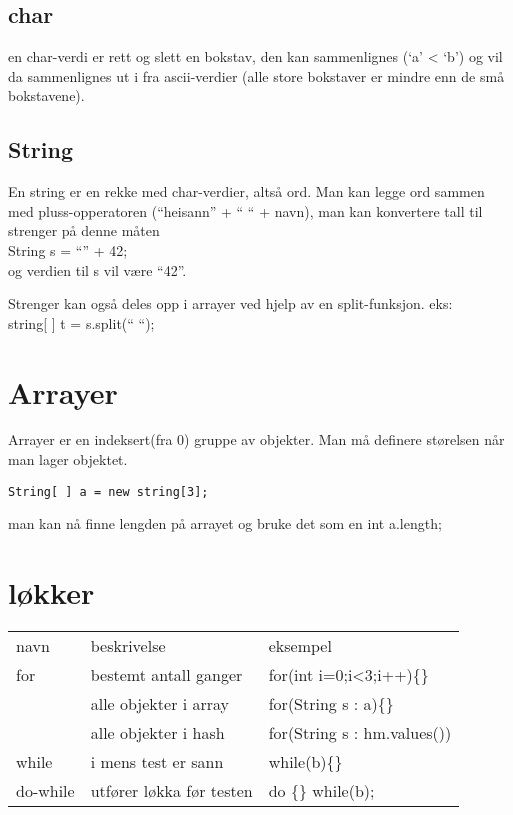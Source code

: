 \documentclass[11pt]{article}
\begin{document}
\subsection{char}
\label{sec-3_1}


   en char-verdi er rett og slett en bokstav, den kan sammenlignes (`a' < `b') 
   og vil da sammenlignes ut
   i fra ascii-verdier (alle store bokstaver er mindre enn de små bokstavene).
\subsection{String}
\label{sec-3_2}


   En string er en rekke med char-verdier, altså ord. Man kan legge ord
   sammen med pluss-opperatoren 
   (``heisann'' + `` `` + navn), man kan konvertere tall til strenger på denne måten\\
   String s = ``'' + 42;\\
   og verdien til s vil være ``42''.

   Strenger kan også deles opp i arrayer ved hjelp av en split-funksjon. eks:\\
   string[ ] t = s.split(`` ``);
\section{Arrayer}
\label{sec-4}


  Arrayer er en indeksert(fra 0) gruppe av objekter. Man må definere
  størelsen når man lager objektet.
\begin{verbatim}
String[ ] a = new string[3];
\end{verbatim}
man kan nå finne lengden på arrayet og bruke det som en int a.length;
\section{løkker}
\label{sec-5}



\begin{center}
\begin{tabular}{lll}
 navn      &  beskrivelse               &  eksempel                     \\
 for       &  bestemt antall ganger     &  for(int i=0;i<3;i++)\{\}     \\
           &  alle objekter i array     &  for(String s : a)\{\}        \\
           &  alle objekter i hash      &  for(String s : hm.values())  \\
 while     &  i mens test er sann       &  while(b)\{\}                 \\
 do-while  &  utfører løkka før testen  &  do \{\} while(b);            \\
\end{tabular}
\end{center}
\end{document}
